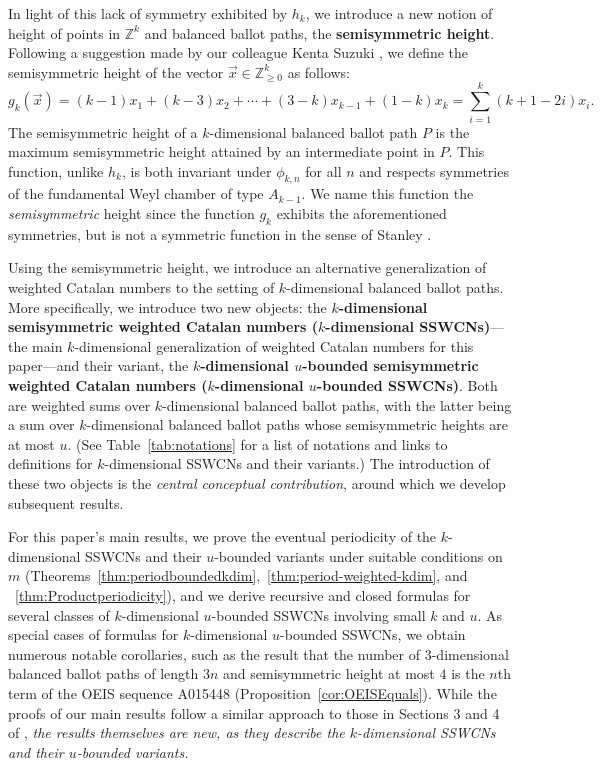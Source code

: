 \documentclass[11pt]{article}
\theoremstyle{remark}
\theoremstyle{definition}
\begin{document}
In light of this lack of symmetry exhibited by $h_k$, we introduce a new notion of height of points in $\mathbb{Z}^k$ and balanced ballot paths, the \textbf{semisymmetric height}. Following a suggestion made by our colleague Kenta Suzuki \cite{KSuzuki}, we define the semisymmetric height of the vector $\vec{x} \in \mathbb{Z}^k_{\geq 0}$ as follows: $$g_k(\vec{x}) = (k-1)x_1 + (k-3)x_2 + \cdots + (3-k)x_{k-1} + (1-k)x_k = \sum_{i=1}^k (k+1-2i)x_i.$$ 
 The semisymmetric height of a $k$-dimensional balanced ballot path $P$ is the maximum semisymmetric height attained by an intermediate point in $P$. This function, unlike $h_k$, is both invariant under $\phi_{k, n}$ for all $n$ and respects symmetries of the fundamental Weyl chamber of type $A_{k-1}$. We name this function the \textit{semisymmetric} height since the function $g_k$ exhibits the aforementioned symmetries, but is not a symmetric function in the sense of Stanley \cite[Chapter 7]{MR4621625}.

Using the semisymmetric height, we introduce an alternative generalization of weighted Catalan numbers to the setting of $k$-dimensional balanced ballot paths. More specifically, we introduce two new objects: the \textbf{$k$-dimensional semisymmetric weighted Catalan numbers ($k$-dimensional SSWCNs)}—the main $k$-dimensional generalization of weighted Catalan numbers for this paper—and their variant, the \textbf{$k$-dimensional $u$-bounded semisymmetric weighted Catalan numbers ($k$-dimensional $u$-bounded SSWCNs)}. Both are weighted sums over $k$-dimensional balanced ballot paths, with the latter being a sum over $k$-dimensional balanced ballot paths whose semisymmetric heights are at most $u$. (See Table~\ref{tab:notations} for a list of notations and links to definitions for $k$-dimensional SSWCNs and their variants.) The introduction of these two objects is the {\em central conceptual contribution}, around which we develop subsequent results.


For this paper's main results, we prove the eventual periodicity of the $k$-dimensional SSWCNs and their $u$-bounded variants under suitable conditions on $m$ (Theorems~\ref{thm:periodboundedkdim},~\ref{thm:period-weighted-kdim}, and ~\ref{thm:Productperiodicity}), and we derive recursive and closed formulas for several classes of $k$-dimensional $u$-bounded SSWCNs involving small $k$ and $u$. As special cases of formulas for $k$-dimensional $u$-bounded SSWCNs, we obtain numerous notable corollaries, such as the result that the number of $3$-dimensional balanced ballot paths of length $3n$ and semisymmetric height at most $4$ is the $n$th term of the OEIS sequence A015448 \cite{oeis} (Proposition~\ref{cor:OEISEquals}). While the proofs of our main results follow a similar approach to those in Sections 3 and 4 of \cite{MR5034574}, {\em the results themselves are new, as they describe the $k$-dimensional SSWCNs and their $u$-bounded variants.}
\end{document}
